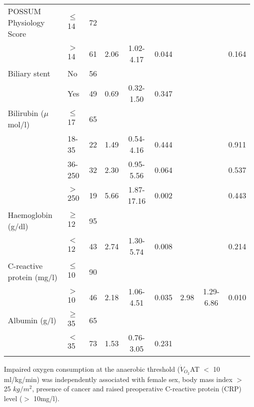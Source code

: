 \begin{sidewaystable}[p]
\begin{tabular}{|l l c| c c c| c c c|}
		POSSUM Physiology Score    & $\leq$ 14 & 72  &      &            &            &      &            &  \\
		                           & $>$ 14    & 61  & 2.06 & 1.02-4.17  & 0.044      &      &            & 0.164      \\
		Biliary stent              & No        & 56  &      &            &            &      &            &  \\
		                           & Yes       & 49  & 0.69 & 0.32-1.50  & 0.347      &      &            &  \\
		Bilirubin ($\mu$mol/l)     & $\leq$ 17 & 65  &      &            &            &      &            &  \\
		                           & 18-35     & 22  & 1.49 & 0.54-4.16  & 0.444      &      &            & 0.911      \\
		                           & 36-250    & 32  & 2.30 & 0.95-5.56  & 0.064      &      &            & 0.537      \\
		                           & $>$ 250   & 19  & 5.66 & 1.87-17.16 & 0.002      &      &            & 0.443      \\
		Haemoglobin (g/dl)         & $\geq$ 12 & 95  &      &            &            &      &            &  \\
		                           & $<$ 12    & 43  & 2.74 & 1.30-5.74  & 0.008      &      &            & 0.214      \\
		C-reactive protein (mg/l)  & $\leq$ 10 & 90  &      &            &            &      &            &  \\
		                           & $>$ 10    & 46  & 2.18 & 1.06-4.51  & 0.035      & 2.98 & 1.29-6.86  & 0.010      \\
		Albumin (g/l)              & $\geq$ 35 & 65  &      &            &            &      &            &  \\
		                           & $<$ 35    & 73  & 1.53 & 0.76-3.05  & 0.231      &      &            &  \\ \hline
	\end{tabular}
	\medskip
	\begin{flushleft}
		Impaired oxygen consumption at the anaerobic threshold ($\dot{V}_{O_2}$AT $<$ 10 ml/kg/min) was independently associated with female sex, body mass index $>$ 25 $kg/m^2$, presence of cancer and raised preoperative C-reactive protein (CRP) level ($>$ 10mg/l).
	\end{flushleft}	
\end{sidewaystable}